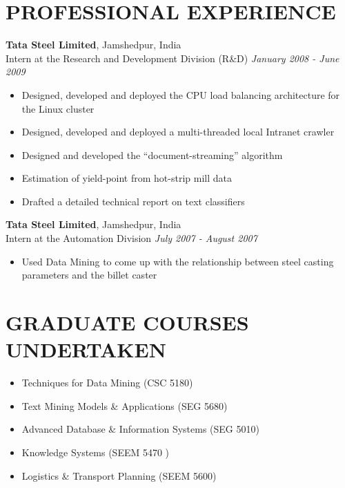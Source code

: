 \documentclass[margin]{res}
\begin{document}
\begin{resume}
\section{PROFESSIONAL EXPERIENCE}
\textbf{Tata Steel Limited}, Jamshedpur, India \\
Intern at the Research and Development Division (R\&D) \hfill {\textit{January 2008 - June 2009}}
\begin{itemize}\itemsep -10pt
\item Designed, developed and deployed the CPU load balancing architecture for the Linux cluster\\
\item Designed, developed and deployed a multi-threaded local Intranet crawler\\
\item Designed and developed the ``document-streaming'' algorithm\\
\item Estimation of yield-point from hot-strip mill data\\
\item Drafted a detailed technical report on text classifiers
\end{itemize}
\textbf{Tata Steel Limited}, Jamshedpur, India \\
Intern at the Automation Division \hfill {\textit{July 2007 - August 2007}}
\begin{itemize}\itemsep -10pt
\item Used Data Mining to come up with the relationship between steel casting parameters and the billet caster
\end{itemize}

\section{GRADUATE COURSES UNDERTAKEN}
\begin{itemize}\itemsep -10pt
\item Techniques for Data Mining (CSC 5180)\\
\item Text Mining Models \& Applications (SEG 5680)\\
\item Advanced Database \& Information Systems (SEG 5010)\\
\item Knowledge Systems (SEEM 5470 )\\
\item Logistics \& Transport Planning (SEEM 5600)
\end{itemize}


\end{resume}
\end{document}
